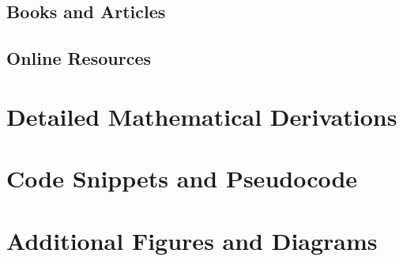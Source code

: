 \documentclass[12pt]{article}
\begin{document}
\subsection{Books and Articles}


\subsection{Online Resources}

\appendix
\section{Detailed Mathematical Derivations}
\label{sec:appendix-derivations}

\section{Code Snippets and Pseudocode}
\label{sec:appendix-code}

\section{Additional Figures and Diagrams}
\label{sec:appendix-figures}
\end{document}
